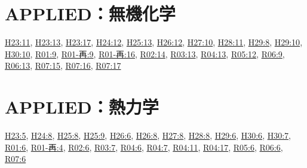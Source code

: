 \section{APPLIED：無機化学}
\hyperref[q:h23-reg-applied-11]{H23:11}, \hyperref[q:h23-reg-applied-13]{H23:13}, \hyperref[q:h23-reg-applied-17]{H23:17}, \hyperref[q:h24-reg-applied-12]{H24:12}, \hyperref[q:h25-reg-applied-13]{H25:13}, \hyperref[q:h26-reg-applied-12]{H26:12}, \hyperref[q:h27-reg-applied-10]{H27:10}, \hyperref[q:h28-reg-applied-11]{H28:11}, \hyperref[q:h29-reg-applied-08]{H29:8}, \hyperref[q:h29-reg-applied-10]{H29:10}, \hyperref[q:h30-reg-applied-10]{H30:10}, \hyperref[q:r01-reg-applied-09]{R01:9}, \hyperref[q:r01-ret-applied-09]{R01-再:9}, \hyperref[q:r01-ret-applied-16]{R01-再:16}, \hyperref[q:r02-reg-applied-14]{R02:14}, \hyperref[q:r03-reg-applied-13]{R03:13}, \hyperref[q:r04-reg-applied-13]{R04:13}, \hyperref[q:r05-reg-applied-12]{R05:12}, \hyperref[q:r06-reg-applied-09]{R06:9}, \hyperref[q:r06-reg-applied-13]{R06:13}, \hyperref[q:r07-reg-applied-15]{R07:15}, \hyperref[q:r07-reg-applied-16]{R07:16}, \hyperref[q:r07-reg-applied-17]{R07:17}
\section{APPLIED：熱力学}
\hyperref[q:h23-reg-applied-05]{H23:5}, \hyperref[q:h24-reg-applied-08]{H24:8}, \hyperref[q:h25-reg-applied-08]{H25:8}, \hyperref[q:h25-reg-applied-09]{H25:9}, \hyperref[q:h26-reg-applied-06]{H26:6}, \hyperref[q:h26-reg-applied-08]{H26:8}, \hyperref[q:h27-reg-applied-08]{H27:8}, \hyperref[q:h28-reg-applied-08]{H28:8}, \hyperref[q:h29-reg-applied-06]{H29:6}, \hyperref[q:h30-reg-applied-06]{H30:6}, \hyperref[q:h30-reg-applied-07]{H30:7}, \hyperref[q:r01-reg-applied-06]{R01:6}, \hyperref[q:r01-ret-applied-04]{R01-再:4}, \hyperref[q:r02-reg-applied-06]{R02:6}, \hyperref[q:r03-reg-applied-07]{R03:7}, \hyperref[q:r04-reg-applied-06]{R04:6}, \hyperref[q:r04-reg-applied-07]{R04:7}, \hyperref[q:r04-reg-applied-11]{R04:11}, \hyperref[q:r04-reg-applied-17]{R04:17}, \hyperref[q:r05-reg-applied-06]{R05:6}, \hyperref[q:r06-reg-applied-06]{R06:6}, \hyperref[q:r07-reg-applied-06]{R07:6}

